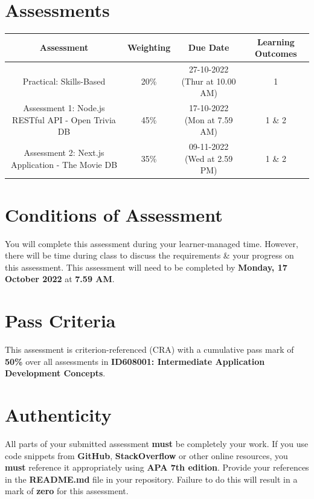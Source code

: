 \documentclass{article}
\begin{document}
\section*{Assessments}
\renewcommand{\arraystretch}{1.5}
\begin{tabular}{|c|c|c|c|}
	\hline
	\textbf{Assessment}                                 & \textbf{Weighting} & \textbf{Due Date}            & \textbf{Learning Outcomes} \\ \hline
	\small Practical: Skills-Based & \small 20\%        & \small 27-10-2022 (Thur at 10.00 AM)   & \small 1                   \\ \hline
	\small Assessment 1: Node.js RESTful API - Open Trivia DB              & \small 45\%        & \small 17-10-2022 (Mon at 7.59 AM)  & \small 1 \& 2                   \\ \hline
	\small Assessment 2: Next.js Application - The Movie DB                       & \small 35\%        & \small 09-11-2022 (Wed at 2.59 PM)  & \small 1 \& 2                   \\ \hline
\end{tabular}

\section*{Conditions of Assessment}
You will complete this assessment during your learner-managed time. However, there will be time during class to discuss the requirements \& your progress on this assessment. This assessment will need to be completed by \textbf{Monday, 17 October 2022} at \textbf{7.59 AM}.

\section*{Pass Criteria}
This assessment is criterion-referenced (CRA) with a cumulative pass mark of \textbf{50\%} over all assessments in \textbf{ID608001: Intermediate Application Development Concepts}.

\section*{Authenticity}
All parts of your submitted assessment \textbf{must} be completely your work. If you use code snippets from \textbf{GitHub}, \textbf{StackOverflow} or other online resources, you \textbf{must} reference it appropriately using \textbf{APA 7th edition}. Provide your references in the \textbf{README.md} file in your repository. Failure to do this will result in a mark of \textbf{zero} for this assessment.
\end{document}
